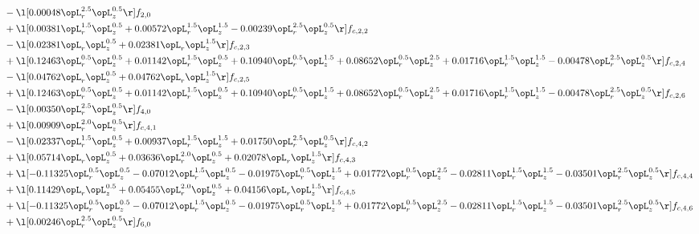 \begin{alignat}{2}
& - \l[  0.00048 \opL_r^{2.5} \opL_z^{0.5}  \r] f_{2,0} \nonumber \\ 
& + \l[  0.00381 \opL_r^{1.5} \opL_z^{0.5} +  0.00572 \opL_r^{1.5} \opL_z^{1.5}   -0.00239 \opL_r^{2.5} \opL_z^{0.5}  \r] f_{c,2,2} \nonumber \\ 
& - \l[  0.02381 \opL_r \opL_z^{0.5} +  0.02381 \opL_r \opL_z^{1.5}  \r] f_{c,2,3} \nonumber \\ 
& + \l[  0.12463 \opL_r^{0.5} \opL_z^{0.5} +  0.01142 \opL_r^{1.5} \opL_z^{0.5} +  0.10940 \opL_r^{0.5} \opL_z^{1.5} +  0.08652 \opL_r^{0.5} \opL_z^{2.5} +  0.01716 \opL_r^{1.5} \opL_z^{1.5}   -0.00478 \opL_r^{2.5} \opL_z^{0.5}  \r] f_{c,2,4} \nonumber \\ 
& - \l[  0.04762 \opL_r \opL_z^{0.5} +  0.04762 \opL_r \opL_z^{1.5}  \r] f_{c,2,5} \nonumber \\ 
& + \l[  0.12463 \opL_r^{0.5} \opL_z^{0.5} +  0.01142 \opL_r^{1.5} \opL_z^{0.5} +  0.10940 \opL_r^{0.5} \opL_z^{1.5} +  0.08652 \opL_r^{0.5} \opL_z^{2.5} +  0.01716 \opL_r^{1.5} \opL_z^{1.5}   -0.00478 \opL_r^{2.5} \opL_z^{0.5}  \r] f_{c,2,6} \nonumber \\ 
& - \l[  0.00350 \opL_r^{2.5} \opL_z^{0.5}  \r] f_{4,0} \nonumber \\ 
& + \l[  0.00909 \opL_r^{2.0} \opL_z^{0.5}  \r] f_{c,4,1} \nonumber \\ 
& - \l[  0.02337 \opL_r^{1.5} \opL_z^{0.5} +  0.00937 \opL_r^{1.5} \opL_z^{1.5} +  0.01750 \opL_r^{2.5} \opL_z^{0.5}  \r] f_{c,4,2} \nonumber \\ 
& + \l[  0.05714 \opL_r \opL_z^{0.5} +  0.03636 \opL_r^{2.0} \opL_z^{0.5} +  0.02078 \opL_r \opL_z^{1.5}  \r] f_{c,4,3} \nonumber \\ 
& + \l[  -0.11325 \opL_r^{0.5} \opL_z^{0.5}   -0.07012 \opL_r^{1.5} \opL_z^{0.5}   -0.01975 \opL_r^{0.5} \opL_z^{1.5} +  0.01772 \opL_r^{0.5} \opL_z^{2.5}   -0.02811 \opL_r^{1.5} \opL_z^{1.5}   -0.03501 \opL_r^{2.5} \opL_z^{0.5}  \r] f_{c,4,4} \nonumber \\ 
& + \l[  0.11429 \opL_r \opL_z^{0.5} +  0.05455 \opL_r^{2.0} \opL_z^{0.5} +  0.04156 \opL_r \opL_z^{1.5}  \r] f_{c,4,5} \nonumber \\ 
& + \l[  -0.11325 \opL_r^{0.5} \opL_z^{0.5}   -0.07012 \opL_r^{1.5} \opL_z^{0.5}   -0.01975 \opL_r^{0.5} \opL_z^{1.5} +  0.01772 \opL_r^{0.5} \opL_z^{2.5}   -0.02811 \opL_r^{1.5} \opL_z^{1.5}   -0.03501 \opL_r^{2.5} \opL_z^{0.5}  \r] f_{c,4,6} \nonumber \\ 
& + \l[  0.00246 \opL_r^{2.5} \opL_z^{0.5}  \r] f_{6,0} \nonumber \\ 

\end{alignat}

